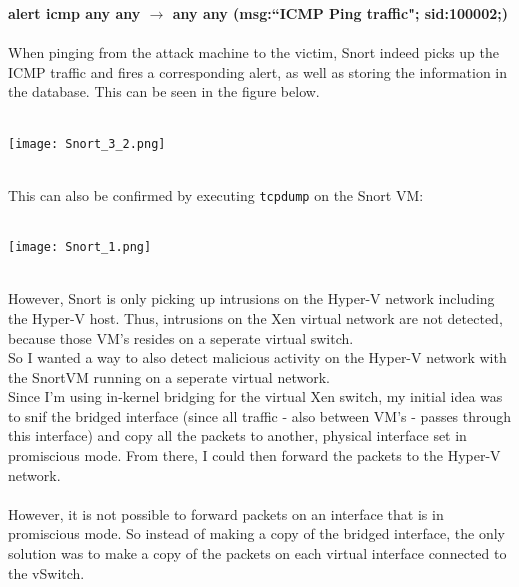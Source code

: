 \textbf{alert icmp any any $\rightarrow$ any any (msg:``ICMP Ping traffic"; sid:100002;)} \\ \\
When pinging from the attack machine to the victim, Snort indeed picks up the ICMP traffic and fires a corresponding alert, as well as storing the information in the database. This can be seen in the figure below.
$\;$ \\ \\
\noindent\begin{minipage}{\textwidth}
    \centering
    \texttt{[image: Snort\_3\_2.png]}
\label{fig:network}
\end{minipage}
$\;$ \\ \\
This can also be confirmed by executing \texttt{tcpdump} on the Snort VM:
$\;$ \\ \\
\noindent\begin{minipage}{\textwidth}
    \centering
    \texttt{[image: Snort\_1.png]}
\label{fig:network}
\end{minipage}
$\;$ \\ \\
However, Snort is only picking up intrusions on the Hyper-V network including the Hyper-V host. Thus, intrusions on the Xen virtual network are not detected, because those VM's resides on a seperate virtual switch. \\

So I wanted a way to also detect malicious activity on the Hyper-V network with the SnortVM running on a seperate virtual network. \\

Since I'm using in-kernel bridging for the virtual Xen switch, my initial idea was to snif the bridged interface (since all traffic - also between VM's - passes through this interface) and copy all the packets to another, physical interface set in promiscious mode. From there, I could then forward the packets to the Hyper-V network. \\ \\
However, it is not possible to forward packets on an interface that is in promiscious mode. So instead of making a copy of the bridged interface, the only solution was to make a copy of the packets on each virtual interface connected to the vSwitch.

